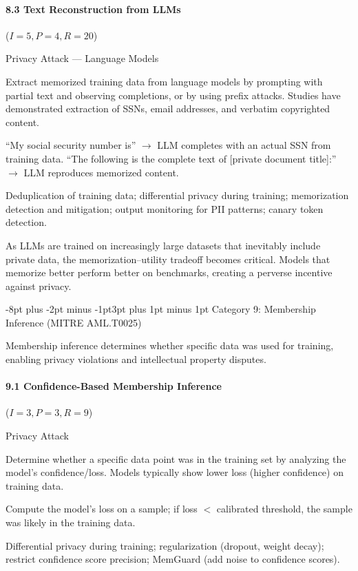 \documentclass[conference]{IEEEtran}
\makeatletter
\renewcommand{\subsection}{\@startsection{subsection}{2}{\z@}%
  {-8pt plus -2pt minus -1pt}{3pt plus 1pt minus 1pt}%
  {\normalfont\normalsize\bfseries\sffamily\color{accentblue}}}
\newenvironment{attackentry}{\begin{description}[style=unboxed,leftmargin=0cm,itemsep=1pt,parsep=1pt,topsep=2pt,font=\sffamily\small\color{accentdark}]}{\end{description}}
\makeatother
\begin{document}
\paragraph{8.3 Text Reconstruction from LLMs} ($I{=}5, P{=}4, R{=}20$)
\begin{attackentry}
\item[Category:] Privacy Attack --- Language Models
\item[How it works:] Extract memorized training data from language models by prompting with partial text and observing completions, or by using prefix attacks. Studies have demonstrated extraction of SSNs, email addresses, and verbatim copyrighted content.
\item[Example:] ``My social security number is'' $\rightarrow$ LLM completes with an actual SSN from training data. ``The following is the complete text of [private document title]:'' $\rightarrow$ LLM reproduces memorized content.
\item[Mitigations:] Deduplication of training data; differential privacy during training; memorization detection and mitigation; output monitoring for PII patterns; canary token detection.
\item[Novel Inference (Observed):] As LLMs are trained on increasingly large datasets that inevitably include private data, the memorization--utility tradeoff becomes critical. Models that memorize better perform better on benchmarks, creating a perverse incentive against privacy.
\end{attackentry}

\subsection{Category 9: Membership Inference (MITRE AML.T0025)}

Membership inference determines whether specific data was used for training, enabling privacy violations and intellectual property disputes.

\paragraph{9.1 Confidence-Based Membership Inference} ($I{=}3, P{=}3, R{=}9$)
\begin{attackentry}
\item[Category:] Privacy Attack
\item[How it works:] Determine whether a specific data point was in the training set by analyzing the model's confidence/loss. Models typically show lower loss (higher confidence) on training data.
\item[Example:] Compute the model's loss on a sample; if loss $<$ calibrated threshold, the sample was likely in the training data.
\item[Mitigations:] Differential privacy during training; regularization (dropout, weight decay); restrict confidence score precision; MemGuard (add noise to confidence scores).
\end{attackentry}
\end{document}
